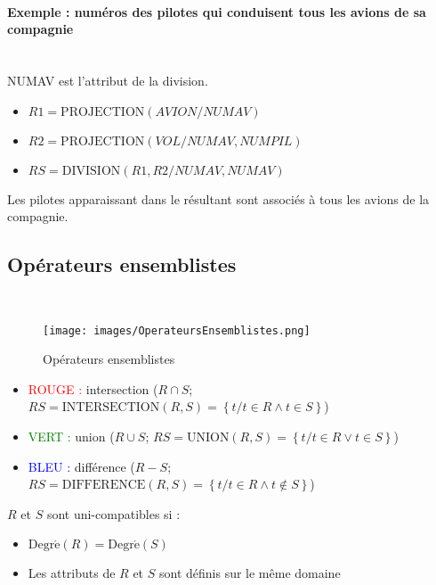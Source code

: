 \documentclass[10pt]{article}
\begin{document}
                \paragraph{Exemple : numéros des pilotes qui conduisent tous les avions de sa compagnie}
                ~\\
                NUMAV est l'attribut de la division.

                \begin{itemize}
                    \renewcommand{\labelitemi}{ } %
                    \item $R1=\mathrm{PROJECTION}(AVION/NUMAV)$
                    \item $R2=\mathrm{PROJECTION}(VOL/NUMAV,NUMPIL)$
                    \item $RS=\mathrm{DIVISION}(R1,R2/NUMAV,NUMAV)$
                \end{itemize}

                Les pilotes apparaissant dans le résultant sont associés à tous les avions de la compagnie.

		\newpage
        \subsection{Opérateurs ensemblistes}
            ~\\ %
            \begin{figure}[H]
                \begin{center}
                    \texttt{[image: images/OperateursEnsemblistes.png]}
                \end{center}
                \caption{Opérateurs ensemblistes}
            \end{figure}

            \begin{itemize}
                \item \textcolor{red}{ROUGE : } intersection ($R\cap S$; $RS=\mathrm{INTERSECTION}(R,S)=\left\{t/t\in R\land t\in S\right\}$)
                \item \textcolor{green}{VERT : } union ($R\cup S$; $RS=\mathrm{UNION}(R,S)=\left\{t/t\in R\lor t\in S\right\}$)
                \item \textcolor{blue}{BLEU : } différence ($R-S$; $RS=\mathrm{DIFFERENCE}(R,S)=\left\{t/t\in R\land t\notin S\right\}$)
            \end{itemize}

            $R$ et $S$ sont uni-compatibles si :
            \begin{itemize}
                \item $\mathrm{Degr\acute{e}}(R)=\mathrm{Degr\acute{e}}(S)$
                \item Les attributs de $R$ et $S$ sont définis sur le même domaine
            \end{itemize}
\end{document}

